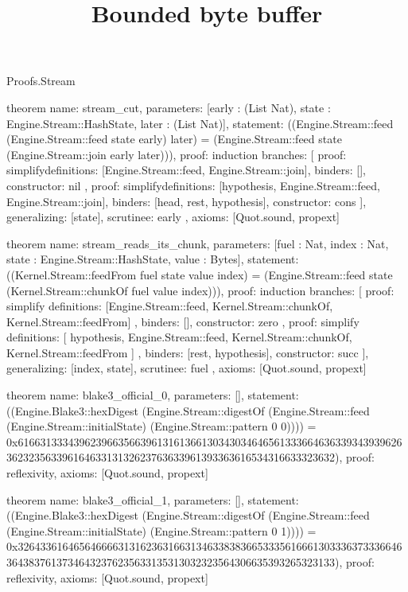 \begin{lexlean}{Proofs.Stream}
\title{Bounded byte buffer}
\begin{semanticmodule}
theorem{
  name: stream_cut,
  parameters: [early : (List Nat), state : Engine.Stream::HashState, later : (List Nat)],
  statement: ((Engine.Stream::feed (Engine.Stream::feed state early) later) = (Engine.Stream::feed state (Engine.Stream::join early later))),
  proof: induction{
    branches: [
      {
        proof: simplify{definitions: [Engine.Stream::feed, Engine.Stream::join]},
        binders: [],
        constructor: nil
      },
      {
        proof: simplify{definitions: [hypothesis, Engine.Stream::feed, Engine.Stream::join]},
        binders: [head, rest, hypothesis],
        constructor: cons
      }
    ],
    generalizing: [state],
    scrutinee: early
  },
  axioms: [Quot.sound, propext]
}

theorem{
  name: stream_reads_its_chunk,
  parameters: [fuel : Nat, index : Nat, state : Engine.Stream::HashState, value : Bytes],
  statement: ((Kernel.Stream::feedFrom fuel state value index) = (Engine.Stream::feed state (Kernel.Stream::chunkOf fuel value index))),
  proof: induction{
    branches: [
      {
        proof: simplify{
          definitions: [Engine.Stream::feed, Kernel.Stream::chunkOf, Kernel.Stream::feedFrom]
        },
        binders: [],
        constructor: zero
      },
      {
        proof: simplify{
          definitions: [
            hypothesis,
            Engine.Stream::feed,
            Kernel.Stream::chunkOf,
            Kernel.Stream::feedFrom
          ]
        },
        binders: [rest, hypothesis],
        constructor: succ
      }
    ],
    generalizing: [index, state],
    scrutinee: fuel
  },
  axioms: [Quot.sound, propext]
}

theorem{
  name: blake3_official_0,
  parameters: [],
  statement: ((Engine.Blake3::hexDigest (Engine.Stream::digestOf (Engine.Stream::feed (Engine.Stream::initialState) (Engine.Stream::pattern 0 0)))) = 0x61663133343962396635663961316136613034303464656133366463633934393962636232356339616463313132623763633961393363616534316633323632),
  proof: reflexivity{},
  axioms: [Quot.sound, propext]
}

theorem{
  name: blake3_official_1,
  parameters: [],
  statement: ((Engine.Blake3::hexDigest (Engine.Stream::digestOf (Engine.Stream::feed (Engine.Stream::initialState) (Engine.Stream::pattern 0 1)))) = 0x32643361646564666631316236316631346338383665333561666130333637333664636438376137346432376235633135313032323564306635393265323133),
  proof: reflexivity{},
  axioms: [Quot.sound, propext]
}


\end{semanticmodule}
\end{lexlean}
